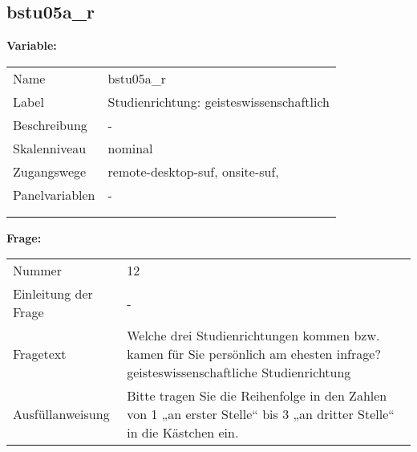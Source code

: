 	
	
	\subsection{bstu05a\_r}
	\label{subSection:bstu05a_r}

	\noindent\textbf{Variable:}\\
		\begin{tabular}{lL{11.3cm}}
			\label{tableVariable:bstu05a_r}
			Name & bstu05a\_r \\
			Label & Studienrichtung: geisteswissenschaftlich \\
			Beschreibung & - \\
			Skalenniveau & nominal \\
			Zugangswege &
				remote-desktop-suf,
				onsite-suf,
 \\
			Panelvariablen & -
			 \\
			 \\
 \\
		\end{tabular}

		\vspace*{1 cm}
		\noindent\textbf{Frage:}\\
		\begin{tabular}{lL{11.3cm}}
			\label{tableQuestion:bstu05a_r}
			Nummer & 12 \\
			Einleitung der Frage & - \\
			Fragetext & Welche drei Studienrichtungen kommen bzw. kamen für Sie persönlich am ehesten infrage?
geisteswissenschaftliche Studienrichtung \\
			Ausfüllanweisung & Bitte tragen Sie die Reihenfolge in den Zahlen von 1 „an erster Stelle“ bis 3 „an dritter Stelle“ in die Kästchen ein. \\
		\end{tabular}





